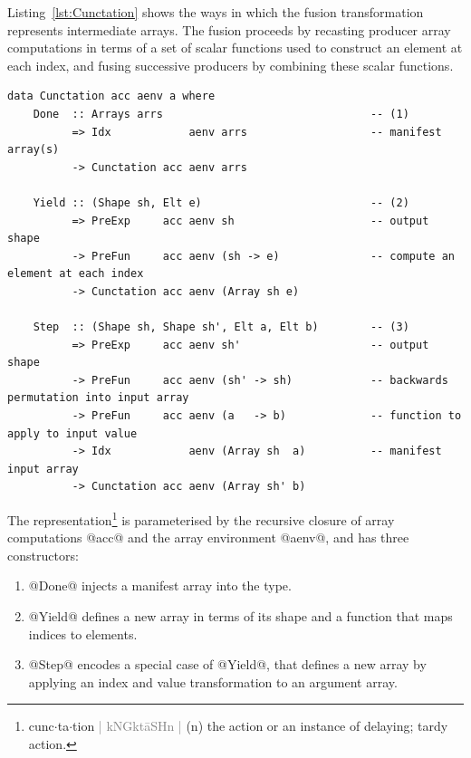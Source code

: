 Listing~\ref{lst:Cunctation} shows the ways in which the fusion transformation
represents intermediate arrays. The fusion proceeds by recasting producer array
computations in terms of a set of scalar functions used to construct an element
at each index,
and fusing successive producers by combining these scalar functions.
%
\begin{lstlisting}[style=haskell_float
    ,label=lst:Cunctation
    ,caption={Representation of fusible producer arrays}]
data Cunctation acc aenv a where
    Done  :: Arrays arrs                                -- (1)
          => Idx            aenv arrs                   -- manifest array(s)
          -> Cunctation acc aenv arrs

    Yield :: (Shape sh, Elt e)                          -- (2)
          => PreExp     acc aenv sh                     -- output shape
          -> PreFun     acc aenv (sh -> e)              -- compute an element at each index
          -> Cunctation acc aenv (Array sh e)

    Step  :: (Shape sh, Shape sh', Elt a, Elt b)        -- (3)
          => PreExp     acc aenv sh'                    -- output shape
          -> PreFun     acc aenv (sh' -> sh)            -- backwards permutation into input array
          -> PreFun     acc aenv (a   -> b)             -- function to apply to input value
          -> Idx            aenv (Array sh  a)          -- manifest input array
          -> Cunctation acc aenv (Array sh' b)
\end{lstlisting}
%
\makeatchar
The representation\footnote{%
cunc$\cdot$ta$\cdot$tion
\textcolor{gray}{|
kNGk\textquotesingle t\={a}SHn \enspace{}\textquotesingle {}
|} (n) the action or an instance of delaying; tardy action.}
\makeatcode
%
is parameterised by the recursive closure of array computations @acc@ and the
array environment @aenv@, and has three constructors:
%
\begin{enumerate}
\item @Done@ injects a manifest array into the type.

\item @Yield@ defines a new array in terms of its shape and a function
    that maps indices to elements.

\item @Step@ encodes a special case of @Yield@, that defines a new
    array by applying an index and value transformation to an argument array.

\end{enumerate}

